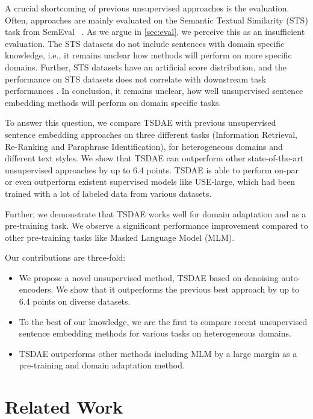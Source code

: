 \documentclass[11pt]{article}
\begin{document}
A crucial shortcoming of previous unsupervised approaches is the evaluation. Often, approaches are mainly evaluated on the Semantic Textual Similarity (STS) task from SemEval ~\citep{DBLP:conf/emnlp/LiZHWYL20,DBLP:journals/corr/abs-2006-03659,carlsson2021semantic,gao2021simcse}. As we argue in \autoref{sec:eval}, we perceive this as an insufficient evaluation. The STS datasets do not include sentences with domain specific knowledge, i.e., it remains unclear how methods will perform on more specific domains. Further, STS datasets have an artificial score distribution, and the performance on STS datasets does not correlate with downstream task performances \cite{DBLP:conf/coling/ReimersBG16}. In conclusion, it remains unclear, how well unsupervised sentence embedding methods will perform on domain specific tasks.

To answer this question, we compare TSDAE with previous unsupervised sentence embedding approaches on three different tasks (Information Retrieval, Re-Ranking and Paraphrase Identification), for heterogeneous domains and different text styles. We show that TSDAE can outperform other state-of-the-art unsupervised approaches by up to 6.4 points. TSDAE is able to perform on-par or even outperform existent supervised models like USE-large, which had been trained with a lot of labeled data from various datasets.

Further, we demonstrate that TSDAE works well for domain adaptation and as a pre-training task. We observe a significant performance improvement compared to other pre-training tasks like Masked Language Model (MLM).


Our contributions are three-fold:
\begin{itemize}
    \item We propose a novel unsupervised method, TSDAE based on denoising auto-encoders. We show that it outperforms the previous best approach by up to 6.4 points on diverse datasets.
    \item To the best of our knowledge, we are the first to compare recent unsupervised sentence embedding methods for various tasks on heterogeneous domains.
    \item TSDAE outperforms other methods including MLM by a large margin as a pre-training and domain adaptation method.
\end{itemize}

\section{Related Work}
\end{document}
